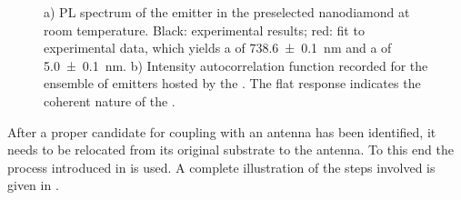 \begin{figure}[!htb]
\begin{subfigure}{ 0.49\linewidth}
						\caption{}
						\label{subfig::coherent_g2}
					\end{subfigure}
					\caption[Properties of a \nd containing an ensemble of \sivs]{a) PL spectrum of the emitter in the preselected nanodiamond at room temperature. Black: experimental results; red: fit to experimental data, which yields a \ZPL \cwl of \SI[separate-uncertainty = true]{738.6\pm0.1}{nm} and a \lw of \SI[separate-uncertainty = true]{5.0\pm0.1}{nm}. b) Intensity autocorrelation function recorded for the ensemble of emitters hosted by the \nd. The flat response indicates the coherent nature of the \fl.}
				\end{figure}

			After a proper candidate for coupling with an antenna has been identified, it needs to be relocated from its original substrate to the antenna. To this end the \pp process introduced in  is used. A complete illustration of the steps involved is given in .

